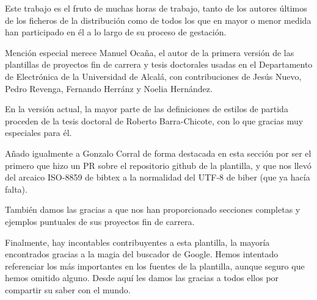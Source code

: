 Este trabajo es el fruto de muchas horas de trabajo, tanto de los
autores últimos de los ficheros de la distribución como de todos los que
en mayor o menor medida han participado en él a lo largo de su proceso
de gestación.

Mención especial merece Manuel Ocaña, el autor de la primera versión de
las plantillas de proyectos fin de carrera y tesis doctorales usadas en
el Departamento de Electrónica de la Universidad de Alcalá, con
contribuciones de Jesús Nuevo, Pedro Revenga, Fernando Herránz y Noelia
Hernández.

En la versión actual, la mayor parte de las definiciones de estilos de
partida proceden de la tesis doctoral de Roberto Barra-Chicote, con lo
que gracias muy especiales para él.

Añado igualmente a Gonzalo Corral de forma destacada en esta sección por ser el
primero que hizo un PR sobre el repositorio github de la plantilla, y que nos
llevó del arcaico ISO-8859 de bibtex a la normalidad del UTF-8 de biber (que ya
hacía falta).

También damos las gracias a  que nos
han proporcionado secciones completas y ejemplos puntuales de sus
proyectos fin de carrera.

Finalmente, hay incontables contribuyentes a esta plantilla, la mayoría
encontrados gracias a la magia del buscador de Google. Hemos intentado
referenciar los más importantes en los fuentes de la plantilla, aunque
seguro que hemos omitido alguno. Desde aquí les damos las gracias a
todos ellos por compartir su saber con el mundo.





